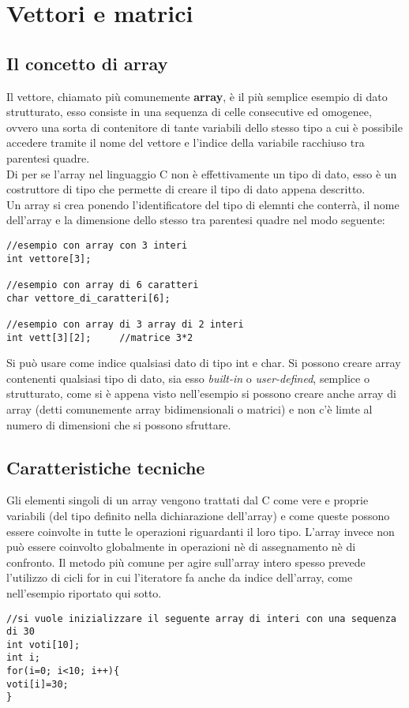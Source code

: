 \chapter{Vettori e matrici}
\section{Il concetto di array}
Il vettore, chiamato più comunemente \textbf{array}, è il più semplice esempio di dato strutturato, esso consiste in una sequenza di celle consecutive ed omogenee, ovvero una sorta di contenitore di tante variabili dello stesso tipo a cui è possibile accedere tramite il nome del vettore e l’indice della variabile racchiuso tra parentesi quadre.\\
Di per se l'array nel linguaggio C non è effettivamente un tipo di dato, esso è un costruttore di tipo che permette di creare il tipo di dato appena descritto. \\
Un array si crea ponendo l'identificatore del tipo di elemnti che conterrà, il nome dell'array e la dimensione dello stesso tra parentesi quadre nel modo seguente:
\begin{lstlisting}[title={Implementazione di un array}]
//esempio con array con 3 interi
int vettore[3];

//esempio con array di 6 caratteri
char vettore_di_caratteri[6];

//esempio con array di 3 array di 2 interi
int vett[3][2];		//matrice 3*2
\end{lstlisting}
Si può usare come indice qualsiasi dato di tipo int e char.
Si possono creare array contenenti qualsiasi tipo di dato, sia esso \textit{built-in} o \textit{user-defined}, semplice o strutturato, come si è appena visto nell'esempio si possono creare anche array di array (detti comunemente array bidimensionali o matrici) e non c'è limte al numero di dimensioni che si possono sfruttare. \\
\section{Caratteristiche tecniche}
Gli elementi singoli di un array vengono trattati dal C come vere e proprie variabili (del tipo definito nella dichiarazione dell'array) e come queste possono essere coinvolte in tutte le operazioni riguardanti il loro tipo. L'array invece non può essere coinvolto globalmente in operazioni nè di assegnamento nè di confronto. Il metodo più comune per agire sull'array intero spesso prevede l'utilizzo di cicli for in cui l'iteratore fa anche da indice dell'array, come nell'esempio riportato qui sotto.
\begin{lstlisting}[title={Implementazione di un array}]
//si vuole inizializzare il seguente array di interi con una sequenza di 30
int voti[10];
int i;
for(i=0; i<10; i++){
voti[i]=30;
}
\end{lstlisting}

